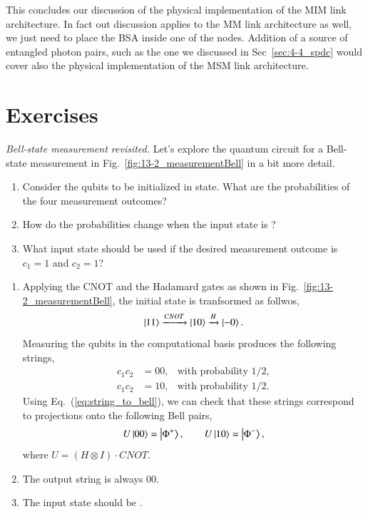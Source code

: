 This concludes our discussion of the physical implementation of the MIM link architecture.
In fact out discussion applies to the MM link architecture as well, we just need to place the BSA inside one of the nodes.
Addition of a source of entangled photon pairs, such as the one we discussed in Sec~\ref{sec:4-4_spdc} would cover also the physical implementation of the MSM link architecture.


\newpage
\section{Exercises}

\begin{exercise}
\emph{Bell-state measurement revisited.} Let's explore the quantum circuit for a Bell-state measurement in Fig.~\ref{fig:13-2_measurementBell} in a bit more detail.
\begin{enumerate}[label=(\alph*)]
    \item Consider the qubits to be initialized in  state. What are the probabilities of the four measurement outcomes?
    \item How do the probabilities change when the input state is \ket{\Phi^+}?
    \item What input state should be used if the desired measurement outcome is $c_1=1$ and $c_2=1$?
\end{enumerate}
\end{exercise}
\begin{solution}
\begin{enumerate}[label=(\alph*)]
    \item Applying the CNOT and the Hadamard gates as shown in Fig.~\ref{fig:13-2_measurementBell}, the initial state  is tranfsormed as follwos,
    \begin{equation*}
        \left| 11 \right\rangle \xrightarrow{CNOT} \left| 10 \right\rangle \xrightarrow{H} \left| -0 \right\rangle. 
    \end{equation*}
    Measuring the qubits in the computational basis produces the following strings,
    \begin{align*}
        c_1c_2 & = 00, & \text{with probability } 1/2, \\
        c_1c_2 & = 10, & \text{with probability } 1/2.
    \end{align*}
    Using Eq.~(\ref{eq:string_to_bell}), we can check that these strings correspond to projections onto the following Bell pairs,
    \begin{equation*}
        U\left| 00 \right\rangle = \left| \Phi^+ \right\rangle, \qquad U\left| 10 \right\rangle = \left| \Phi^- \right\rangle,
    \end{equation*}
    where $U=(H\otimes I)\cdot CNOT$.
    \item The output string is always 00.
    \item The input state should be \ket{\Psi^-}.
\end{enumerate}
\end{solution}

